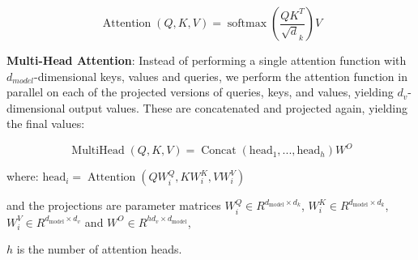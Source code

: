 \begin{equation}
    \operatorname{Attention}(Q, K, V ) = \operatorname{softmax}(\frac{QK^{T}}{\sqrt d_{k}}) V
\end{equation}

\textbf{Multi-Head Attention}: Instead of performing a single attention function with $d_{model}$-dimensional keys, values and queries, we perform the attention function in parallel on each of the projected versions of queries, keys, and values, yielding $d_{v}$-dimensional output values.
These are concatenated and projected again, yielding the final values:

\begin{equation}
    \operatorname{MultiHead}(Q, K, V ) = \operatorname{Concat}(\mathrm{head}_{1}, ..., \mathrm{head}_{h})W^{O}
\end{equation}

where: $\mathrm{head}_{i} = \operatorname{Attention}(QW_{i}^{Q}, KW_{i}^{K}, VW_{i}^{V})$ 

and the projections are parameter matrices $W_{i}^{Q} \in R^{d_{\mathrm{model}} \times d_{k}}$, $W_{i}^{K} \in R^{d_{\mathrm{model}} \times d_{k}}$, $W_{i}^{V} \in R^{d_{\mathrm{model}} \times d_{v}}$ and $W^{O} \in R^{hd_{v} \times d_{\mathrm{model}}}$,

$h$ is the number of attention heads.
